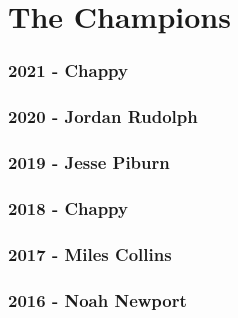 \documentclass[
]{book}
\begin{document}
\hypertarget{appendix-appendix}{%
\appendix}


\hypertarget{the-champions}{%
\chapter{The Champions}\label{the-champions}}

\hypertarget{chappy}{%
\subsection*{\texorpdfstring{\textbf{2021} - Chappy}{2021 - Chappy}}\label{chappy}}

\hypertarget{jordan-rudolph}{%
\subsection*{\texorpdfstring{\textbf{2020} - Jordan Rudolph}{2020 - Jordan Rudolph}}\label{jordan-rudolph}}

\hypertarget{jesse-piburn}{%
\subsection*{\texorpdfstring{\textbf{2019} - Jesse Piburn}{2019 - Jesse Piburn}}\label{jesse-piburn}}

\hypertarget{chappy-1}{%
\subsection*{\texorpdfstring{\textbf{2018} - Chappy}{2018 - Chappy}}\label{chappy-1}}

\hypertarget{miles-collins-1}{%
\subsection*{\texorpdfstring{\textbf{2017} - Miles Collins}{2017 - Miles Collins}}\label{miles-collins-1}}

\hypertarget{noah-newport}{%
\subsection*{\texorpdfstring{\textbf{2016} - Noah Newport}{2016 - Noah Newport}}\label{noah-newport}}
\end{document}
